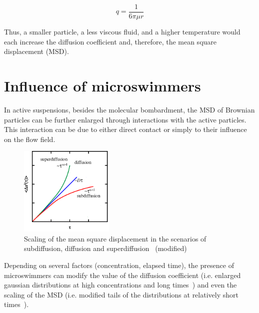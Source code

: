\begin{equation}
q=\frac{1}{6 \pi \mu r}
\end{equation}

Thus, a smaller particle, a less viscous fluid, and a higher temperature would each increase the diffusion coefficient and, therefore, the mean square displacement (MSD). 

\section{Influence of microswimmers}

In active suspensions, besides the molecular bombardment, the MSD of Brownian particles can be further enlarged through interactions with the active particles. This interaction can be due to either direct contact or simply to their influence on the flow field.

\begin{figure}[H]
	\centering
	\includegraphics[width=0.4\textwidth]{archivos/SubSuperDif.png}
	\caption{Scaling of the mean square displacement in the scenarios of subdiffusion, diffusion and superdiffusion~\cite{MacKintosh7138} (modified)}
	\label{SSDif}
\end{figure}

Depending on several factors (concentration, elapsed time), the presence of microswimmers can modify the value of the diffusion coefficient (i.e. enlarged gaussian distributions at high concentrations and long times~\cite{Kurtuldu2011}) and even the scaling of the MSD (i.e. modified tails of the distributions at relatively short times~\cite{Kurtuldu2011}). 